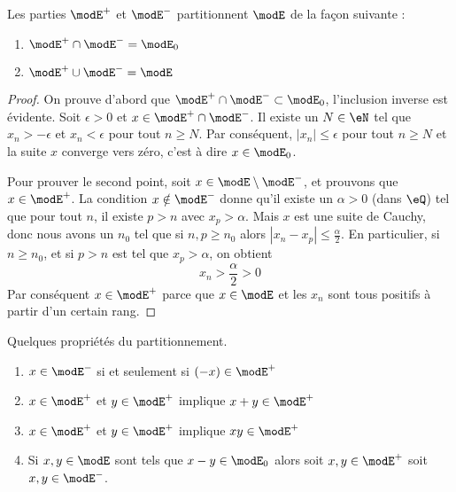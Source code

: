 \begin{lemma}
    Les parties \( \modE^+\) et \( \modE^-\) partitionnent \( \modE\) de la façon suivante :
    \begin{enumerate}
        \item
            \( \modE^+\cap\modE^-=\modE_0\)
        \item
            \( \modE^+\cup\modE^-=\modE\)
    \end{enumerate}
\end{lemma}

\begin{proof}
    On prouve d'abord que \( \modE^+\cap\modE^-\subset\modE_0\), l'inclusion inverse est évidente. Soit \( \epsilon>0\) et \( x\in \modE^+\cap\modE^-\). Il existe un \( N\in \eN\) tel que \( x_n>-\epsilon\) et \( x_n<\epsilon\) pour tout \( n\geq N\). Par conséquent, \( | x_n |\leq \epsilon\) pour tout \( n\geq N\) et la suite \( x\) converge vers zéro, c'est à dire \( x\in\modE_0\).

    Pour prouver le second point, soit \( x\in \modE\setminus\modE^-\), et prouvons que \( x\in\modE^+\). La condition \( x\notin \modE^-\) donne qu'il existe un \( \alpha>0\) (dans \( \eQ\)) tel que pour tout \( n\), il existe \( p>n\) avec \( x_p>\alpha\). Mais \( x\) est une suite de Cauchy, donc nous avons un \( n_0\) tel que si \( n,p\geq n_0\) alors \( | x_n-x_p |\leq \frac{ \alpha }{2}\). En particulier, si \( n\geq n_0\), et si \( p>n\) est tel que \( x_p>\alpha\), on obtient
    \begin{equation}
        x_n>\frac{ \alpha }{2}>0
    \end{equation}
    Par conséquent \( x\in\modE^+\) parce que \( x\in\modE\) et les \( x_n \) sont tous positifs à partir d'un certain rang.
\end{proof}

\begin{lemma}
    Quelques propriétés du partitionnement.
    \begin{enumerate}
        \item
            \( x\in\modE^-\) si et seulement si \( (-x)\in\modE^+\)
        \item
            \( x\in\modE^+\) et \( y\in\modE^+\) implique \( x+y\in\modE^+\)
        \item
            \( x\in\modE^+\) et \( y\in\modE^+\) implique \( xy\in\modE^+\)
        \item
            Si \( x,y\in\modE\) sont tels que \( x-y\in\modE_0\) alors soit \( x,y\in\modE^+\) soit \( x,y\in\modE^-\).
    \end{enumerate}
\end{lemma}

